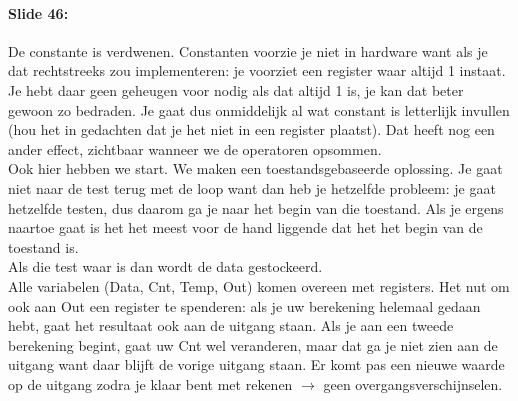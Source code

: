 \documentclass[10pt,a4paper]{book}
\begin{document}
\paragraph{Slide 46:} De constante is verdwenen. Constanten voorzie je niet in hardware want als je dat rechtstreeks zou implementeren: je voorziet een register waar altijd 1 instaat. Je hebt daar geen geheugen voor nodig als dat altijd 1 is, je kan dat beter gewoon zo bedraden. Je gaat dus onmiddelijk al wat constant is letterlijk invullen (hou het in gedachten dat je het niet in een register plaatst). Dat heeft nog een ander effect, zichtbaar wanneer we de operatoren opsommen.\\
Ook hier hebben we start. We maken een toestandsgebaseerde oplossing. Je gaat niet naar de test terug met de loop want dan heb je hetzelfde probleem: je gaat hetzelfde testen, dus daarom ga je naar het begin van die toestand. Als je ergens naartoe gaat is het het meest voor de hand liggende dat het het begin van de toestand is.\\
Als die test waar is dan wordt de data gestockeerd.\\
Alle variabelen (Data, Cnt, Temp, Out) komen overeen met registers. Het nut om ook aan Out een register te spenderen: als je uw berekening helemaal gedaan hebt, gaat het resultaat ook aan de uitgang staan. Als je aan een tweede berekening begint, gaat uw Cnt wel veranderen, maar dat ga je niet zien aan de uitgang want daar blijft de vorige uitgang staan. Er komt pas een nieuwe waarde op de uitgang zodra je klaar bent met rekenen $\rightarrow$ geen overgangsverschijnselen.
\end{document}

